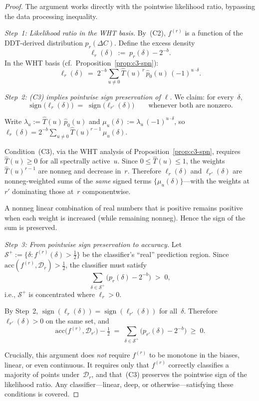 \documentclass[runningheads]{llncs}
\begin{document}
\begin{proof}
The argument works directly with the pointwise likelihood ratio,
bypassing the data processing inequality.

\medskip\noindent\textit{Step~1: Likelihood ratio in the WHT basis.}
By~(C2), $f^{(r)}$ is a function of the DDT-derived distribution
$p_r(\Delta C)$.
Define the excess density
\[
  \ell_r(\delta)
  \;:=\;
  p_r(\delta) - 2^{-b}.
\]
In the WHT basis (cf.\ Proposition~\ref{prop:c3-spn}):
\[
  \ell_r(\delta)
  \;=\;
  2^{-b}\!\sum_{u \neq 0}
  \hat{T}(u)^{\,r}\,\hat{p}_0(u)\,(-1)^{u \cdot \delta}.
\]

\medskip\noindent\textit{Step~2: (C3) implies pointwise sign
preservation of $\ell$.}
We claim: for every~$\delta$,
\[
  \operatorname{sign}\!\bigl(\ell_r(\delta)\bigr)
  \;=\;
  \operatorname{sign}\!\bigl(\ell_{r'}(\delta)\bigr)
  \qquad\text{whenever both are nonzero.}
\]

Write $\lambda_u := \hat{T}(u)\,\hat{p}_0(u)$ and
$\mu_u(\delta) := \lambda_u\,(-1)^{u \cdot \delta}$, so
$\ell_r(\delta) = 2^{-b}\sum_{u \neq 0}
\hat{T}(u)^{r-1}\,\mu_u(\delta)$.

Condition~(C3), via the WHT analysis of
Proposition~\ref{prop:c3-spn}, requires
$\hat{T}(u) \geq 0$ for all spectrally active~$u$.
Since $0 \leq \hat{T}(u) \leq 1$, the weights
$\hat{T}(u)^{r-1}$ are nonneg and decrease in~$r$.
Therefore $\ell_r(\delta)$ and $\ell_{r'}(\delta)$ are
nonneg-weighted sums of the \emph{same} signed terms
$\{\mu_u(\delta)\}$---with the weights at~$r'$ dominating
those at~$r$ componentwise.

A nonneg linear combination of real numbers that is positive remains
positive when each weight is increased (while remaining nonneg).
Hence the sign of the sum is preserved.

\medskip\noindent\textit{Step~3: From pointwise sign preservation to
accuracy.}
Let $\mathcal{S}^+ := \{\delta : f^{(r)}(\delta) > \tfrac{1}{2}\}$ be
the classifier's ``real'' prediction region.
Since $\mathrm{acc}(f^{(r)}, \mathcal{D}_r) > \tfrac{1}{2}$, the
classifier must satisfy
\[
  \sum_{\delta \in \mathcal{S}^+}
  \bigl(p_r(\delta) - 2^{-b}\bigr)
  \;>\; 0,
\]
i.e., $\mathcal{S}^+$ is concentrated where $\ell_r > 0$.

By Step~2, $\operatorname{sign}(\ell_r(\delta))
= \operatorname{sign}(\ell_{r'}(\delta))$ for all~$\delta$.
Therefore $\ell_{r'}(\delta) > 0$ on the same set, and
\[
  \mathrm{acc}\bigl(f^{(r)}, \mathcal{D}_{r'}\bigr) - \tfrac{1}{2}
  \;=\;
  \sum_{\delta \in \mathcal{S}^+}
  \bigl(p_{r'}(\delta) - 2^{-b}\bigr)
  \;\geq\; 0.
\]

Crucially, this argument does \emph{not} require $f^{(r)}$ to be
monotone in the biases, linear, or even continuous.
It requires only that $f^{(r)}$ correctly classifies a majority of
points under~$\mathcal{D}_r$, and that~(C3) preserves the pointwise
sign of the likelihood ratio.
Any classifier---linear, deep, or otherwise---satisfying these conditions
is covered.
\end{proof}
\end{document}
